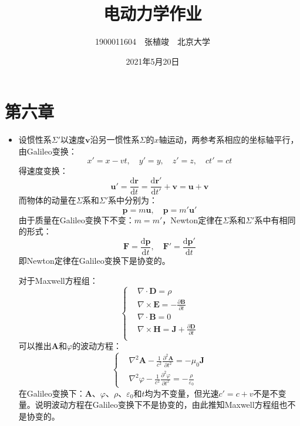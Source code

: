 \documentclass[a4paper,fontset=none]{ctexart}
\begin{document}
\title{\textbf{电动力学作业}}
\author{1900011604\ \ 张植竣\ \ 北京大学}
\date{2021年5月20日}
\maketitle

\section*{第六章}

\begin{itemize}

    \item[1.]
    设惯性系$\varSigma'$以速度$\bm{v}$沿另一惯性系$\varSigma$的$x$轴运动，两参考系相应的坐标轴平行，由Galileo变换：
    \[
        x' = x - vt,\quad y' = y,\quad z' = z,\quad ct' = ct
    \]
    得速度变换：
    \[
        \bm{u}' = \frac{\mathrm{d}\bm{r}}{\mathrm{d}t} = \frac{\mathrm{d}\bm{r}'}{\mathrm{d}t'} + \bm{v} = \bm{u} + \bm{v}
    \]
    而物体的动量在$\varSigma$系和$\varSigma'$系中分别为：
    \[
        \bm{p} = m\bm{u},\quad \bm{p} = m'\bm{u}'
    \]
    由于质量在Galileo变换下不变：$m=m'$，Newton定律在$\varSigma$系和$\varSigma'$系中有相同的形式：
    \[
        \bm{F} = \frac{\mathrm{d}\bm{p}}{\mathrm{d}t},\quad \bm{F}' = \frac{\mathrm{d}\bm{p}'}{\mathrm{d}t}
    \]
    即Newton定律在Galileo变换下是协变的。

    对于Maxwell方程组：
    \[
        \left\{
        \begin{aligned}
            &\nabla \cdot \bm{D} = \rho \\
            &\nabla \times \bm{E} = -\frac{\partial\bm{B}}{\partial t} \\
            &\nabla \cdot \bm{B} = 0 \\
            &\nabla \times \bm{H} = \bm{J} + \frac{\partial\bm{D}}{\partial t} \\
        \end{aligned}
        \right.
    \]
    可以推出$\bm{A}$和$\varphi$的波动方程：
    \[
        \left\{
        \begin{aligned}
            &\nabla^2\bm{A} - \frac{1}{c^2}\frac{\partial^2\bm{A}}{\partial t^2} = -\mu_0\bm{J} \\
            &\nabla^2\varphi - \frac{1}{c^2}\frac{\partial^2\varphi}{\partial t^2} = -\frac{\rho}{\varepsilon_0}
        \end{aligned}
        \right.
    \]
    在Galileo变换下：$\bm{A}$、$\varphi$、$\rho$、$\varepsilon_0$和$t$均为不变量，但光速$c'=c+v$不是不变量。说明波动方程在Galileo变换下不是协变的，由此推知Maxwell方程组也不是协变的。


\end{itemize}
\end{document}
